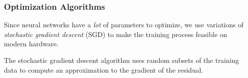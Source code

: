 \begin{frame}
    \frametitle{Optimization Algorithms}

    Since neural networks have a \textit{lot} of parameters to optimize, we use variations of \textit{stochastic 
    gradient descent} (SGD) to make the training process feasible on modern hardware.

    \bigskip
    \pause

    The stochastic gradient descent algorithm uses random subsets of the training data to compute an approximation to 
    the gradient of the residual.

    \bigskip
    \pause
\end{frame}
